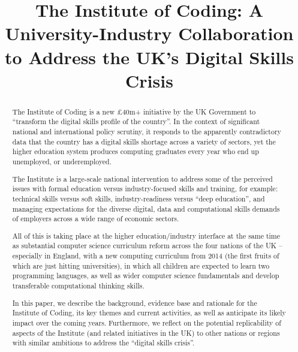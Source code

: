 \documentclass[conference]{IEEEtran}
\begin{document}
\title{The Institute of Coding: A University-Industry Collaboration to Address the UK's Digital Skills Crisis}

\author{
} %
 
\maketitle

\begin{abstract}
The Institute of Coding is a new \pounds40m+ initiative by the UK
Government to ``transform the digital skills profile of the
country''. In the context of significant national and international
policy scrutiny, it responds to the apparently contradictory data that
the country has a digital skills shortage across a variety of sectors,
yet the higher education system produces computing graduates every
year who end up unemployed, or underemployed.

The Institute is a large-scale national intervention to address some
of the perceived issues with formal education versus industry-focused
skills and training, for example: technical skills versus soft skills,
industry-readiness versus ``deep education'', and managing
expectations for the diverse digital, data and computational skills
demands of employers across a wide range of economic sectors.

All of this is taking place at the higher education/industry interface
at the same time as substantial computer science curriculum reform
across the four nations of the UK -- especially in England, with a new
computing curriculum from 2014 (the first fruits of which are just hitting universities), in which all children are expected to
learn two programming languages, as well as wider computer science
fundamentals and develop transferable computational thinking skills.

In this paper, we describe the background, evidence base and rationale
for the Institute of Coding, its key themes and current activities, as
well as anticipate its likely impact over the coming
years. Furthermore, we reflect on the potential replicability of
aspects of the Institute (and related initiatives in the UK) to other
nations or regions with similar ambitions to address the ``digital
skills crisis''.
\end{abstract}
\end{document}
